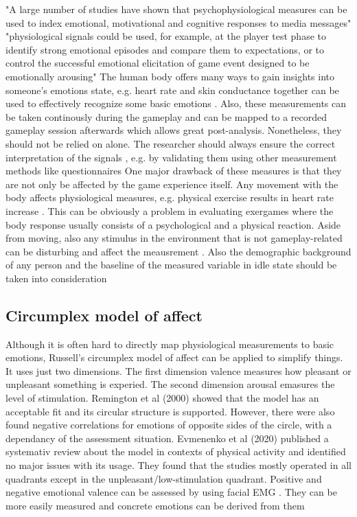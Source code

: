 "A large number of studies have shown that psychophysiological measures can be used to index emotional, motivational and cognitive responses to media messages" \cite{kivikangas2011review}
"physiological signals could be used, for example, at the player test phase to identify strong emotional episodes and compare them to expectations, or to control the successful emotional elicitation of game event designed to be emotionally arousing" \cite{kivikangas2011review}
The human body offers many ways to gain insights into someone's emotions state, e.g. heart rate and skin conductance together can be used to effectively recognize some basic emotions \cite{hamdi2015emotion}. Also, these measurements can be taken continously during the gameplay and can be mapped to a recorded gameplay session afterwards \cite{nacke2015physiological} which allows great post-analysis. Nonetheless, they should not be relied on alone. The researcher should always ensure the correct interpretation of the signals \cite{nacke2015physiological}, e.g. by validating them using other measurement methods like questionnaires 
One major drawback of these measures is that they are not only be affected by the game experience itself. Any movement with the body affects physiological measures, e.g. physical exercise results in heart rate increase \cite{javorka2002heart}. This can be obviously a problem in evaluating exergames where the body response usually consists of a psychological and a physical reaction. Aside from moving, also any stimulus in the environment that is not gameplay-related can be disturbing and affect the meausrement \cite{nacke2015physiological}. Also the demographic background of any person and the baseline of the measured variable in idle state should be taken into consideration \cite{nacke2015physiological} 

\subsection{Circumplex model of affect}
Although it is often hard to directly map physiological measurements to basic emotions, Russell’s circumplex model of affect \cite{russell1980circumplex} can be applied to simplify things. It uses just two dimensions. The first dimension valence measures how pleasant or unpleasant something is experied. The second dimension arousal emasures the level of stimulation. Remington et al (2000) \cite{remington2000reexamining} showed that the model has an acceptable fit and its circular structure is supported. However, there were also found negative correlations for emotions of opposite sides of the circle, with a dependancy of the assessment situation. Evmenenko et al (2020) published a systemativ review about the model in contexts of physical activity and identified no major issues with its usage. They found that the studies mostly operated in all quadrants except in the unpleasant/low-stimulation quadrant.
 Positive and negative emotional valence can be assessed by using facial EMG \cite{kivikangas2011review}. They can be more easily measured and concrete emotions can be derived from them \cite{seo2019automatic} 






